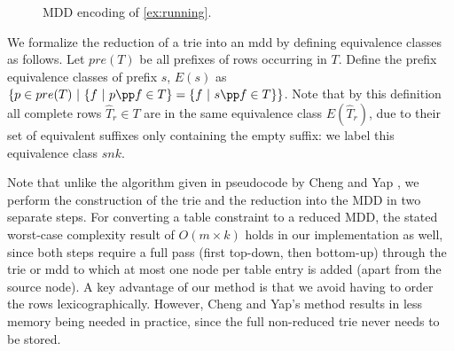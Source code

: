{\begin{figure}[H]
\caption{MDD encoding of \cref{ex:running}.}
\label{fig:trie_mdd_combined}

\end{figure}
We formalize the reduction of a trie into an \gls{mdd} by defining equivalence classes as follows. Let $pre(T)$ be all prefixes of rows occurring in $T$. Define the prefix equivalence classes of prefix $s$, $E(s)$ as $\{ p \in pre(T) ~|~ \{ f ~|~ p \pp f \in T\} = \{ f ~|~ s \pp f \in T\}\}$.  Note that by this definition all complete rows $\hat{T}_r \in T$ are in the same equivalence class $E(\hat{T}_r)$, due to their set of equivalent suffixes only containing the empty suffix: we label this equivalence class $snk$. 

Note that unlike the algorithm given in pseudocode by Cheng and Yap \cite{DBLP:journals/constraints/ChengY10}, we perform the construction of the trie and the reduction into the MDD in two separate steps. For converting a table constraint to a reduced MDD, the stated worst-case complexity result of $O(m \times k)$ holds in our implementation as well, since both steps require a full pass (first top-down, then bottom-up) through the trie or \gls{mdd} to which at most one node per table entry is added (apart from the source node). A key advantage of our method is that we avoid having to order the rows lexicographically. However, Cheng and Yap's method results in less memory being needed in practice, since the full non-reduced trie never needs to be stored.

}
